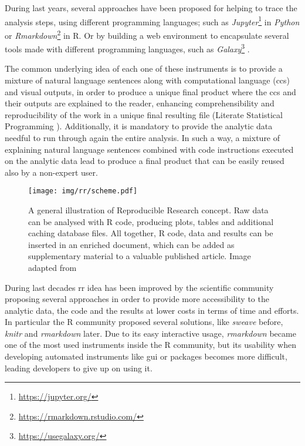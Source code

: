 During last years, several approaches \cite{russo2015advantages} have been proposed for helping to trace the analysis steps, using different programming languages; such as  \textit{Jupyter}\footnote{\url{https://jupyter.org/}} \cite{Kluyver2016} in \textit{Python} or \textit{Rmarkdown}\footnote{\url{https://rmarkdown.rstudio.com/}} in R.
Or by building a web environment to encapsulate several tools made with different programming languages, such as \textit{Galaxy}\footnote{\url{https://usegalaxy.org/}} \cite{Blankenberg2010, Giardine2005, Goecks2010}.

The common underlying idea of each one of these instruments is to provide a mixture of natural language sentences along with computational language (\glspl{cc}) and visual outputs, in order to produce a unique final product where the \glspl{cc} and their outputs are explained to the reader, enhancing comprehensibility and reproducibility of the work in a unique final resulting file (Literate Statistical Programming \cite{Knuth1984a}).
Additionally, it is mandatory to provide the analytic data needful to run through again the entire analysis.
In such a way, a mixture of explaining natural language sentences combined with code instructions executed on the analytic data lead to produce a final product that can be easily reused also by a non-expert user.

\begin{figure}[H]
\centering
\texttt{[image: img/rr/scheme.pdf]}
\caption[Reproducible Research illustration]{A general illustration of Reproducible Research concept. Raw data can be analysed with R code, producing plots, tables and additional caching database files. All together, R code, data and results can be inserted in an enriched document, which can be added as supplementary material to a valuable published article.\newline
Image adapted from \cite{RussoRighelli2016}}
\label{fig:rrscheme}
\end{figure}

During last decades \gls{rr} idea has been improved by the scientific community proposing several approaches in order to provide more accessibility to the analytic data, the code and the results at lower costs in terms of time and efforts.
In particular the R community proposed several solutions, like \textit{sweave} \cite{Leisch2002a, Leisch2002} before, \textit{knitr} \cite{Xie2012} and \textit{rmarkdown} later.
Due to its easy interactive usage, \textit{rmarkdown} became one of the most used instruments inside the R community, but its usability when developing automated instruments like \gls{gui} or packages becomes more difficult, leading developers to give up on using it.


